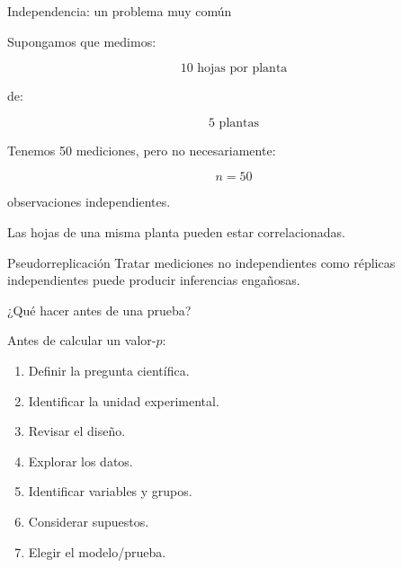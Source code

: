 \documentclass[aspectratio=169,11pt]{beamer}
\begin{document}
\begin{frame}{Independencia: un problema muy común}

Supongamos que medimos:

\[
10\text{ hojas por planta}
\]

de:

\[
5\text{ plantas}
\]

Tenemos 50 mediciones, pero no necesariamente:

\[
n=50
\]

observaciones independientes.

Las hojas de una misma planta pueden estar correlacionadas.

\begin{alertblock}{Pseudorreplicación}
Tratar mediciones no independientes como réplicas independientes
puede producir inferencias engañosas.
\end{alertblock}

\end{frame}

\begin{frame}{¿Qué hacer antes de una prueba?}

Antes de calcular un valor-$p$:

\begin{enumerate}
    \item Definir la pregunta científica.
    \item Identificar la unidad experimental.
    \item Revisar el diseño.
    \item Explorar los datos.
    \item Identificar variables y grupos.
    \item Considerar supuestos.
    \item Elegir el modelo/prueba.
\end{enumerate}

\end{frame}
\end{document}
